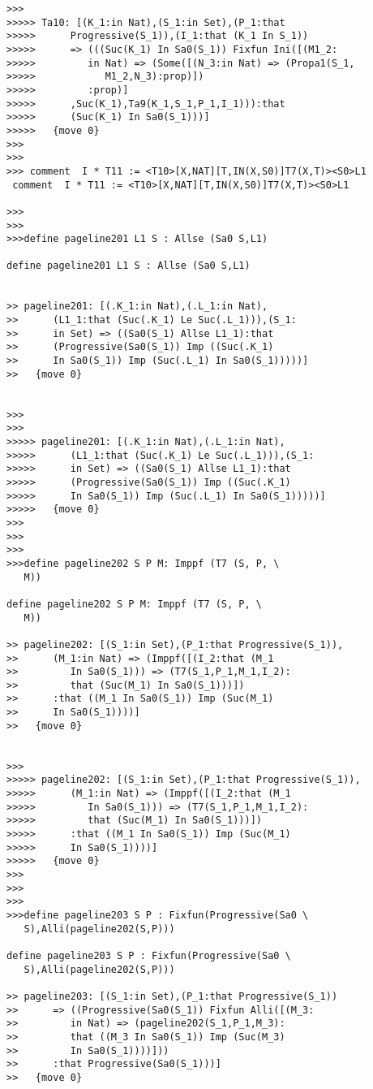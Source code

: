 \documentclass{article}
\begin{document}
\begin{verbatim}
>>>
>>>>> Ta10: [(K_1:in Nat),(S_1:in Set),(P_1:that
>>>>>      Progressive(S_1)),(I_1:that (K_1 In S_1))
>>>>>      => (((Suc(K_1) In Sa0(S_1)) Fixfun Ini([(M1_2:
>>>>>         in Nat) => (Some([(N_3:in Nat) => (Propa1(S_1,
>>>>>            M1_2,N_3):prop)])
>>>>>         :prop)]
>>>>>      ,Suc(K_1),Ta9(K_1,S_1,P_1,I_1))):that
>>>>>      (Suc(K_1) In Sa0(S_1)))]
>>>>>   {move 0}
>>>
>>>
>>> comment  I * T11 := <T10>[X,NAT][T,IN(X,S0)]T7(X,T)><S0>L1
 comment  I * T11 := <T10>[X,NAT][T,IN(X,S0)]T7(X,T)><S0>L1

>>>
>>>
>>>define pageline201 L1 S : Allse (Sa0 S,L1)

define pageline201 L1 S : Allse (Sa0 S,L1)


>> pageline201: [(.K_1:in Nat),(.L_1:in Nat),
>>      (L1_1:that (Suc(.K_1) Le Suc(.L_1))),(S_1:
>>      in Set) => ((Sa0(S_1) Allse L1_1):that
>>      (Progressive(Sa0(S_1)) Imp ((Suc(.K_1)
>>      In Sa0(S_1)) Imp (Suc(.L_1) In Sa0(S_1)))))]
>>   {move 0}


>>>
>>>
>>>>> pageline201: [(.K_1:in Nat),(.L_1:in Nat),
>>>>>      (L1_1:that (Suc(.K_1) Le Suc(.L_1))),(S_1:
>>>>>      in Set) => ((Sa0(S_1) Allse L1_1):that
>>>>>      (Progressive(Sa0(S_1)) Imp ((Suc(.K_1)
>>>>>      In Sa0(S_1)) Imp (Suc(.L_1) In Sa0(S_1)))))]
>>>>>   {move 0}
>>>
>>>
>>>
>>>define pageline202 S P M: Imppf (T7 (S, P, \
   M))

define pageline202 S P M: Imppf (T7 (S, P, \
   M))

>> pageline202: [(S_1:in Set),(P_1:that Progressive(S_1)),
>>      (M_1:in Nat) => (Imppf([(I_2:that (M_1
>>         In Sa0(S_1))) => (T7(S_1,P_1,M_1,I_2):
>>         that (Suc(M_1) In Sa0(S_1)))])
>>      :that ((M_1 In Sa0(S_1)) Imp (Suc(M_1)
>>      In Sa0(S_1))))]
>>   {move 0}


>>>
>>>>> pageline202: [(S_1:in Set),(P_1:that Progressive(S_1)),
>>>>>      (M_1:in Nat) => (Imppf([(I_2:that (M_1
>>>>>         In Sa0(S_1))) => (T7(S_1,P_1,M_1,I_2):
>>>>>         that (Suc(M_1) In Sa0(S_1)))])
>>>>>      :that ((M_1 In Sa0(S_1)) Imp (Suc(M_1)
>>>>>      In Sa0(S_1))))]
>>>>>   {move 0}
>>>
>>>
>>>
>>>define pageline203 S P : Fixfun(Progressive(Sa0 \
   S),Alli(pageline202(S,P)))

define pageline203 S P : Fixfun(Progressive(Sa0 \
   S),Alli(pageline202(S,P)))

>> pageline203: [(S_1:in Set),(P_1:that Progressive(S_1))
>>      => ((Progressive(Sa0(S_1)) Fixfun Alli([(M_3:
>>         in Nat) => (pageline202(S_1,P_1,M_3):
>>         that ((M_3 In Sa0(S_1)) Imp (Suc(M_3)
>>         In Sa0(S_1))))]))
>>      :that Progressive(Sa0(S_1)))]
>>   {move 0}



\end{verbatim}
\end{document}
